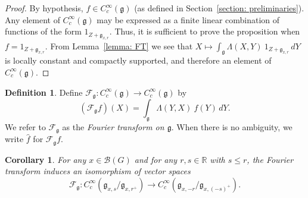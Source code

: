 \documentclass[11pt]{amsart}
\newtheorem{corollary}[theorem]{Corollary}
\theoremstyle{definition}
\newtheorem{definition}[theorem]{Definition}
\theoremstyle{remark}
\numberwithin{equation}{theorem}
\def\R{{\mathbb{R}}}
\def\GF{{G}}
\def\gF{{\mathfrak{g}}}
\def\kill#1#2{{\Lambda\left({#1},{#2}\right)}}
\def\B{{\mathcal{B}}}
\def\Fourier{{\mathcal{F}}}
\def\Sch#1{{C^\infty_c(#1)}}
\def\rightcoset{{ / }}
\begin{document}
\begin{proof}
By hypothesis, $f\in \Sch{\gF}$ (as defined in
Section~\ref{section: preliminaries}). Any element of $\Sch{\gF}$
may be expressed as a finite linear combination of functions of
the form $1_{Z+\gF_{x,r}}$. Thus, it is sufficient to prove the
proposition when $f = 1_{Z+\gF_{x,r}}$. From Lemma~\ref{lemma: FT}
we see that $X \mapsto \int_{\gF} \kill{X}{Y}\ 1_{Z+\gF_{x,r}}\,
dY$ is locally constant and compactly supported, and therefore an
element of $\Sch{\gF}$.
\end{proof}


\begin{definition}\label{definition: Fourier transform}
Define $\Fourier_\gF : \Sch{\gF} \to \Sch{\gF}$ by
\begin{equation}
(\Fourier_\gF f)(X) = \int_{\gF} \kill{Y}{X}\ f(Y)\, dY.
\end{equation}
We refer to $\Fourier_\gF$ as the {\em Fourier transform on
$\gF$}. When there is no ambiguity, we write $\widehat{f}$ for
$\Fourier_\gF f$.
\end{definition}

\begin{corollary}\label{corollary: FT bijection}
For any $x\in \B(\GF)$ and for any $r,s\in \R$ with $s\leq r$, the
Fourier transform induces an isomorphism of vector spaces
\begin{equation}
\Fourier_\gF : \Sch{\gF_{x,s}\rightcoset\gF_{x,r^+}}\to
\Sch{\gF_{x,-r}\rightcoset\gF_{x,(-s)^+}}.
\end{equation}
\end{corollary}
\end{document}
